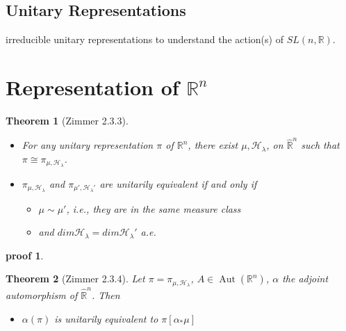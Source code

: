 \documentclass[
  12pt
]{article}
\theoremstyle{break}
\newtheorem{thm}{Theorem}
\theoremstyle{plain}
\newtheorem*{pf}{proof}
\newcommand{\bbr}{\ensuremath{\mathbb{R}}\xspace}
\newcommand{\hilb}{\ensuremath{\mathscr{H}}\xspace}
\DeclareMathOperator{\Aut}{Aut}
\begin{document}
  \hypertarget{unitary-representations}{%
  \subsection{Unitary Representations}\label{unitary-representations}}


  irreducible unitary representations to understand the action(s) of
  $SL(n, \mathbb{R})$.




\hypertarget{representation-of-rn}{%
\section{Representation of \texorpdfstring{$\bbr^n$}{R\^{}n}}\label{representation-of-rn}}


  \begin{thm}[Zimmer 2.3.3]
    \label{thm:2.3.3}
    \begin{itemize}
      \item For any unitary representation $\pi$ of
        $\mathbb{R}^n$, there exist $\mu, \mathscr{H}_{\lambda}$, on
        $\hat{\mathbb{R}}^n$ such that $\pi \cong \pi_{\mu, \mathscr{H}_{\lambda}}$.
      \item $\pi_{\mu, \mathscr{H}_{\lambda}}$ and
        $\pi_{\mu', \mathscr{H}_{\lambda}'}$ are unitarily equivalent if and only if 
        \begin{itemize}
          \item $\mu \sim \mu'$, i.e., they are in the same measure class
          \item and $dim\mathscr{H}_{\lambda} = dim \mathscr{H}_{\lambda}'$ a.e.
        \end{itemize}
    \end{itemize}
  \end{thm}

  \begin{pf}
    \label{pf2.3.3}
  \end{pf}

  \begin{thm}[Zimmer 2.3.4]
    \label{thm:2.3.4}
    Let $\pi = \pi_{\mu, \hilb_{\lambda}}$, $A\in  \Aut(\bbr^n)$, $\alpha$ the
    adjoint automorphism of $\hat{\bbr}^n$. Then
    \begin{itemize}
      \item $\alpha(\pi)$ is unitarily equivalent to $\pi[\alpha_*\mu]$
    \end{itemize}
  \end{thm}
\end{document}
